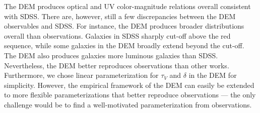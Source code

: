 

The DEM produces optical and UV color-magnitude relations overall consistent
with SDSS. There are, however, still a few discrepancies between the DEM
observables and SDSS.  For instance, the DEM produces broader distributions
overall than observations.
Galaxies in SDSS sharply cut-off above the red sequence, while some galaxies in
the DEM broadly extend beyond the cut-off. The DEM also produces galaxies 
more luminous galaxies than SDSS. Nevertheless, the DEM better reproduces
observations than other works. Furthermore, we chose linear parameterization
for $\tau_V$ and $\delta$ in the DEM for simplicity. However, the
empirical framework of the DEM can easily be extended to more flexible
parameterizations that better reproduce observations --- the only challenge
would be to find a well-motivated parameterization from observations.

